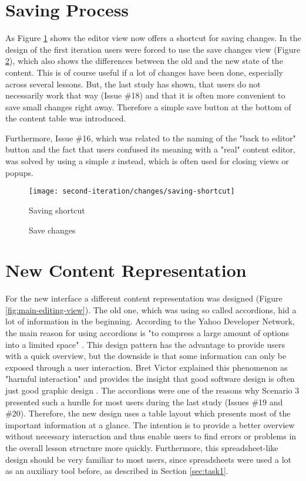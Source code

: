 \section{Saving Process}
As Figure \ref{fig:saving-shortcut} shows the editor view now offers a shortcut for saving changes. In the design of the first iteration users were forced to use the save changes view (Figure \ref{fig:save-changes}), which also shows the differences between the old and the new state of the content. This is of course useful if a lot of changes have been done, especially across several lessons. But, the last study has shown, that users do not necessarily work that way (Issue \#18) and that it is often more convenient to save small changes right away. Therefore a simple save button at the bottom of the content table was introduced.

Furthermore, Issue \#16, which was related to the naming of the "back to editor" button and the fact that users confused its meaning with a "real" content editor, was solved by using a simple \emph{x} instead, which is often used for closing views or popups.

\begin{figure}[h!]
 \centering
 \texttt{[image: second-iteration/changes/saving-shortcut]}
 \caption{Saving shortcut}
 \label{fig:saving-shortcut}
\end{figure}

\begin{figure}[hp!]
 \centering
 \caption{Save changes}
 \label{fig:save-changes}
\end{figure}

\section{New Content Representation}
For the new interface a different content representation was designed (Figure \ref{fig:main-editing-view}). The old one, which was using so called accordions, hid a lot of information in the beginning. According to the Yahoo Developer Network, the main reason for using accordions is "to compress a large amount of options into a limited space" \cite{_accordion_2009}. This design pattern has the advantage to provide users with a quick overview, but the downside is that some information can only be exposed through a user interaction. Bret Victor explained this phenomenon as "harmful interaction" and provides the insight that good software design is often just good graphic design \cite{victor_magic_2006}. The accordions were one of the reasons why Scenario 3 presented such a hurdle for most users during the last study (Issues \#19 and \#20). Therefore, the new design uses a table layout which presents most of the important information at a glance. The intention is to provide a better overview without necessary interaction and thus enable users to find errors or problems in the overall lesson structure more quickly. Furthermore, this spreadsheet-like design should be very familiar to most users, since spreadsheets were used a lot as an auxiliary tool before, as described in Section \ref{sec:task1}.

